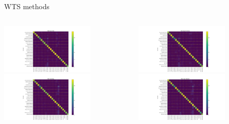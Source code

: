 \begin{frame}{WTS methods}
    \begin{columns}
        \begin{column}{0.6\textwidth}
            \includegraphics[height=0.7\textheight,width=0.7\textwidth,keepaspectratio]{images/conf_mat_naive.png}
            \includegraphics[height=0.7\textheight,width=0.7\textwidth,keepaspectratio]{images/conf_mat_fgbg.png}
        \end{column}
        \begin{column}{0.6\textwidth}
            \includegraphics[height=0.7\textheight,width=0.7\textwidth,keepaspectratio]{images/conf_mat_microfaune.png}
            \includegraphics[height=0.7\textheight,width=0.7\textwidth,keepaspectratio]{images/conf_mat_tweetynet.png}
        \end{column}
    \end{columns}
\end{frame}

